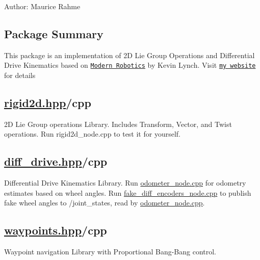 Author\+: Maurice Rahme

\subsection*{Package Summary}

This package is an implementation of 2D Lie Group Operations and Differential Drive Kinematics based on \href{http://hades.mech.northwestern.edu/index.php/Modern_Robotics}{\tt Modern Robotics} by Kevin Lynch. Visit \href{https://moribots.github.io/project/ekfslam}{\tt my website} for details

\subsection*{\hyperlink{rigid2d_8hpp}{rigid2d.\+hpp}/cpp}

2D Lie Group operations Library. Includes Transform, Vector, and Twist operations. Run {\ttfamily rigid2d\+\_\+node.\+cpp} to test it for yourself.

\subsection*{\hyperlink{diff__drive_8hpp}{diff\+\_\+drive.\+hpp}/cpp}

Differential Drive Kinematics Library. Run {\ttfamily \hyperlink{odometer__node_8cpp}{odometer\+\_\+node.\+cpp}} for odometry estimates based on wheel angles. Run {\ttfamily \hyperlink{fake__diff__encoders__node_8cpp}{fake\+\_\+diff\+\_\+encoders\+\_\+node.\+cpp}} to publish fake wheel angles to {\ttfamily /joint\+\_\+states}, read by {\ttfamily \hyperlink{odometer__node_8cpp}{odometer\+\_\+node.\+cpp}}.

\subsection*{\hyperlink{waypoints_8hpp}{waypoints.\+hpp}/cpp}

Waypoint navigation Library with Proportional Bang-\/\+Bang control. 